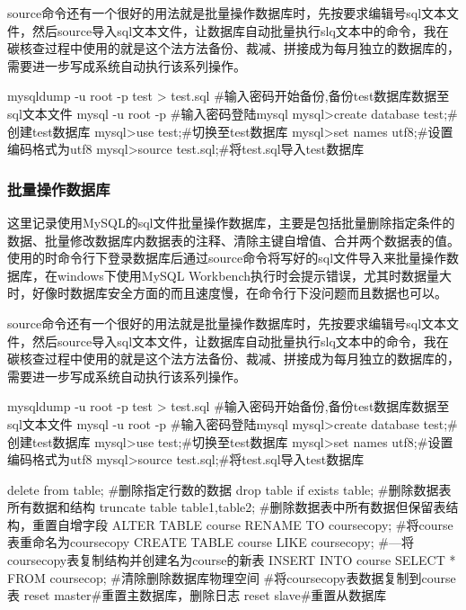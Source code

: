 source命令还有一个很好的用法就是批量操作数据库时，先按要求编辑号sql文本文件，然后source导入sql文本文件，让数据库自动批量执行slq文本中的命令，我在碳核查过程中使用的就是这个法方法备份、裁减、拼接成为每月独立的数据库的，需要进一步写成系统自动执行该系列操作。
\begin{shell}
mysqldump -u root -p test > test.sql
#输入密码开始备份,备份test数据库数据至sql文本文件
mysql -u root -p
#输入密码登陆mysql
mysql>create database test;#创建test数据库
mysql>use test;#切换至test数据库
mysql>set names utf8;#设置编码格式为utf8
mysql>source test.sql;#将test.sql导入test数据库
\end{shell}
\subsubsection{批量操作数据库}
这里记录使用MySQL的sql文件批量操作数据库，主要是包括批量删除指定条件的数据、批量修改数据库内数据表的注释、清除主键自增值、合并两个数据表的值。使用的时命令行下登录数据库后通过source命令将写好的sql文件导入来批量操作数据库，在windows下使用MySQL Workbench执行时会提示错误，尤其时数据量大时，好像时数据库安全方面的而且速度慢，在命令行下没问题而且数据也可以。

source命令还有一个很好的用法就是批量操作数据库时，先按要求编辑号sql文本文件，然后source导入sql文本文件，让数据库自动批量执行slq文本中的命令，我在碳核查过程中使用的就是这个法方法备份、裁减、拼接成为每月独立的数据库的，需要进一步写成系统自动执行该系列操作。
\begin{shell}
mysqldump -u root -p test > test.sql
#输入密码开始备份,备份test数据库数据至sql文本文件
mysql -u root -p
#输入密码登陆mysql
mysql>create database test;#创建test数据库
mysql>use test;#切换至test数据库
mysql>set names utf8;#设置编码格式为utf8
mysql>source test.sql;#将test.sql导入test数据库
\end{shell}
\begin{shell}
delete from table;
#删除指定行数的数据
drop table if exists table;
#删除数据表所有数据和结构
truncate table table1,table2;
#删除数据表中所有数据但保留表结构，重置自增字段
ALTER TABLE course RENAME TO coursecopy;
#将course表重命名为coursecopy
CREATE TABLE course LIKE coursecopy;
#—将coursecopy表复制结构并创建名为course的新表
INSERT INTO course SELECT * FROM coursecop;
#清除删除数据库物理空间
#将coursecopy表数据复制到course表
reset master#重置主数据库，删除日志
reset slave#重置从数据库

\end{shell}
